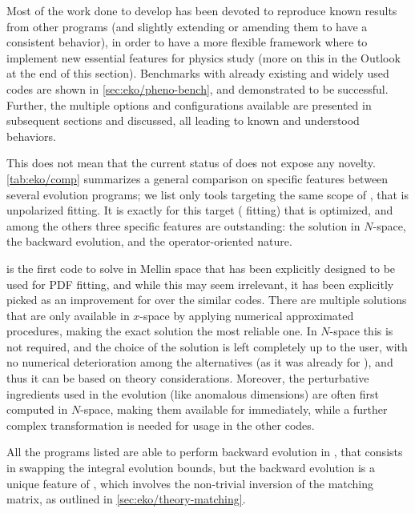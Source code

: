 Most of the work done to develop \eko{} has been devoted to reproduce known
results from other programs (and slightly extending or amending them to have a
consistent behavior), in order to have a more flexible framework where to
implement new essential features for physics study (more on this in the Outlook
at the end of this section).
Benchmarks with already existing and widely used codes are shown in
\cref{sec:eko/pheno-bench}, and demonstrated to be successful.
Further, the multiple options and configurations available are presented in
subsequent sections and discussed, all leading to known and understood
behaviors.

This does not mean that the current status of \eko{} does not expose any
novelty. \cref{tab:eko/comp} summarizes a general comparison on specific features
between several evolution programs; we list only tools targeting the same scope
of \eko{}, that is unpolarized \pdf{} fitting.
It is exactly for this target (\pdf{} fitting) that \eko{} is optimized, and
among the others three specific features are outstanding: the solution in
$N$-space, the backward \vfns{} evolution, and the operator-oriented nature.

\eko{} is the first code to solve \dglap{} in Mellin space that has been
explicitly designed to be used for PDF fitting, and while this may seem
irrelevant, it has been explicitly picked as an improvement for \eko{} over the
similar codes.
There are multiple solutions that are only available in $x$-space by applying
numerical approximated procedures, making the exact solution the most reliable
one.
In $N$-space this is not required, and the choice of the solution is left
completely up to the user, with no numerical deterioration among the
alternatives (as it was already for \pegasus{}), and thus it can be based on
theory considerations.
Moreover, the perturbative \qcd{} ingredients used in the evolution (like
anomalous dimensions) are often first computed in $N$-space, making them
available for \eko{} immediately, while a further complex transformation is
needed for usage in the other codes.

All the programs listed are able to perform backward evolution in \ffns{}, that
consists in swapping the integral evolution bounds, but the \vfns{} backward
evolution is a unique feature of \eko{}, which involves the non-trivial
inversion of the matching matrix, as outlined in
\cref{sec:eko/theory-matching}.

